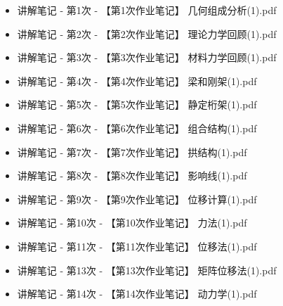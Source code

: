 \documentclass[UTF8,zihao=-4,openany]{ctexbook}
\begin{document}
\begin{itemize}
\item 讲解笔记 - 第1次 - 【第1次作业笔记】 几何组成分析(1).pdf
\item 讲解笔记 - 第2次 - 【第2次作业笔记】 理论力学回顾(1).pdf
\item 讲解笔记 - 第3次 - 【第3次作业笔记】 材料力学回顾(1).pdf
\item 讲解笔记 - 第4次 - 【第4次作业笔记】 梁和刚架(1).pdf
\item 讲解笔记 - 第5次 - 【第5次作业笔记】 静定桁架(1).pdf
\item 讲解笔记 - 第6次 - 【第6次作业笔记】 组合结构(1).pdf
\item 讲解笔记 - 第7次 - 【第7次作业笔记】 拱结构(1).pdf
\item 讲解笔记 - 第8次 - 【第8次作业笔记】 影响线(1).pdf
\item 讲解笔记 - 第9次 - 【第9次作业笔记】 位移计算(1).pdf
\item 讲解笔记 - 第10次 - 【第10次作业笔记】 力法(1).pdf
\item 讲解笔记 - 第11次 - 【第11次作业笔记】 位移法(1).pdf
\item 讲解笔记 - 第13次 - 【第13次作业笔记】 矩阵位移法(1).pdf
\item 讲解笔记 - 第14次 - 【第14次作业笔记】 动力学(1).pdf
\end{itemize}
\end{document}
